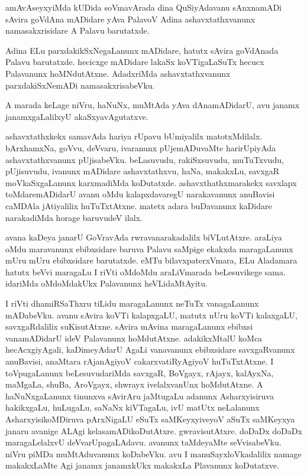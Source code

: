 \documentclass{article}
\begin{document}
\begin{mng}%
amAvAseyxyiMda kUDida soVmavArada dina QuSiyAdavanu sAnxnamADi sAvira 
goVdAna mADidare yAva PalavoV Adina ashavxtathxvanunx namasakxrisidare 
A Palavu barutatxde.
\end{mng}

\begin{mng}%
Adina ELu parxdakikSxNegaLanunx mADidare, hatutx sAvira goVdAnada 
Palavu barutatxde. hecicxge mADidare lakaSx koVTigaLaSuTx hecucx 
Palavanunx hoMNdutAtxne. AdadxriMda ashavxtathxvanunx parxdakiSxNemADi 
namasakxrisabeVku.
\end{mng}

\begin{mng}%
A marada keLage niVru, haNuNx, muMtAda yAva dAnamADidarU, avu janamx 
janamxgaLalilxyU akaSxyavAgutatxve.
\end{mng}

\begin{mng}%
ashavxtathxkekx samavAda hariya rUpavu bUmiyalilx matotxMdilalx. 
bArxhamxNa, goVvu, deVvaru, ivaranunx pUjemADuvaMte harirUpiyAda 
ashavxtathxvanunx pUjisabeVku. beLasuvudu, rakiSxsuvudu, muTuTxvudu, 
pUjisuvudu, ivanunx mADidare ashavxtathxvu, haNa, makakxLu, savxgaR 
moVkaSxgaLanunx karxmadiMda koDutatxde. ashavxthathxmarakekx savxlapx 
toMdaremADidarU avanu oMdu kalapxdavaregU narakavanunx anuBavisi 
caMDAla jAtiyalilix huTuTxtAtxne. matetx adara buDavanunx kaDidare 
narakadiMda horage baruvudeV ilalx.
\end{mng}

\begin{mng}%
avana kaDeya janarU GoVravAda rwravanarakadalilx biVLutAtxre. araLiya 
oMdu maravanunx ebibxsidare baruva Palavu saMpige ekakxda maragaLanunx 
mUru mUru ebibxsidare barutatxde. eMTu bilavxpaterxVmara, ELu 
Aladamara hatutx beVvi maragaLu I riVti oMdoMdu araLiVmarada 
beLesuvikege sama. idariMda oMdoMdakUkx Palavanunx heVLidaMtAyitu.
\end{mng}

\begin{mng}%
I riVti dhamiRSaThxru tiLidu maragaLanunx neTuTx vanagaLanunx 
mADabeVku. avanu sAvira koVTi kalapxgaLU, matutx nUru koVTi kalaxgaLU, 
savxgaRdalilix suKisutAtxne. sAvira mAvina maragaLanunx ebibxsi 
vanamADidarU ideV Palavanunx hoMdutAtxne. adakikxMtalU koMca 
hecAcxgiyAgali, kaDimeyAdarU AgaLi vanavanunx ebibxsidare 
savxgaRvanunx anuBavisi, anaMtara rAjanAgiyoV cakarxvatiRyAgiyoV 
huTuTxtAtxne. I toVpugaLanunx beLesuvudariMda savxgaR, BoVgayx, 
rAjayx, kalAyxNa, maMgaLa, shuBa, AroVgayx, shwrayx ivelalxvanUnx 
hoMdutAtxne. A haNuNxgaLanunx tinunxva sAvirAru jaMtugaLu adanunx 
Asharxyisiruva hakikxgaLu, huLugaLu, saNaNx kiVTagaLu, ivU matUtx 
neLalanunx AsharxyisikoMDiruva pArxNigaLU eSuTx saMKeyxyiveyoV aSuTx 
saMKeyxya janaru avanige ALAgi kelasamADikoDutAtxre. gwravisutAtxre. 
doDaDx doDaDx maragaLelalxvU deVvarUpagaLAdavu. avanunx taMdeyaMte 
seVvisabeVku. niVru piMDa muMtAduvanunx koDabeVku. avu I 
manuSayxloVkadalilix namage makakxLaMte Agi janamx janamxkUkx makakxLa 
Plavanunx koDutatxve.
\end{mng}
\end{document}
